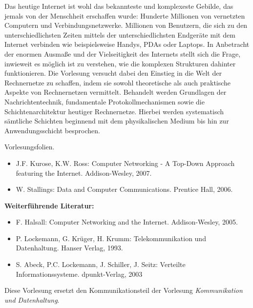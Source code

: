 \begin{course}
\begin{content}
Das heutige Internet ist wohl das bekannteste und komplexeste Gebilde, das jemals von der Menschheit erschaffen wurde: Hunderte Millionen von vernetzten Computern und Verbindungsnetzwerke. Millionen von Benutzern, die sich zu den unterschiedlichsten Zeiten mittels der unterschiedlichsten Endgeräte mit dem Internet verbinden wie beispielsweise Handys, PDAs oder Laptops. In Anbetracht der enormen Ausmaße und der Vielseitigkeit des Internets stellt sich die Frage, inwieweit es möglich ist zu verstehen, wie die komplexen Strukturen dahinter funktionieren. Die Vorlesung versucht dabei den Einstieg in die Welt der Rechnernetze zu schaffen, indem sie sowohl theoretische als auch praktische Aspekte von Rechnernetzen vermittelt. Behandelt werden Grundlagen der Nachrichtentechnik, fundamentale Protokollmechanismen sowie die Schichtenarchitektur heutiger Rechnernetze. Hierbei werden systematisch sämtliche Schichten beginnend mit dem physikalischen Medium bis hin zur Anwendungsschicht besprochen.


\end{content}

\begin{media}Vorlesungsfolien.

\end{media}

\begin{literature}\begin{itemize}\item  J.F. Kurose, K.W. Ross: Computer Networking - A Top-Down Approach featuring the Internet. Addison-Wesley, 2007.   \item  W. Stallings: Data and Computer Communications. Prentice Hall, 2006.  \end{itemize}

\textbf{Weiterführende Literatur:}

 \begin{itemize}\item  F. Halsall: Computer Networking and the Internet. Addison-Wesley, 2005.  \item P. Lockemann, G. Krüger, H. Krumm: Telekommunikation und Datenhaltung. Hanser Verlag, 1993.   \item  S. Abeck, P.C. Lockemann, J. Schiller, J. Seitz: Verteilte Informationssysteme. dpunkt-Verlag, 2003  \end{itemize}\end{literature}

\begin{remarks}Diese Vorlesung ersetzt den Kommunikationsteil der Vorlesung \emph{Kommunikation und Datenhaltung}.

\end{remarks}

\end{course}